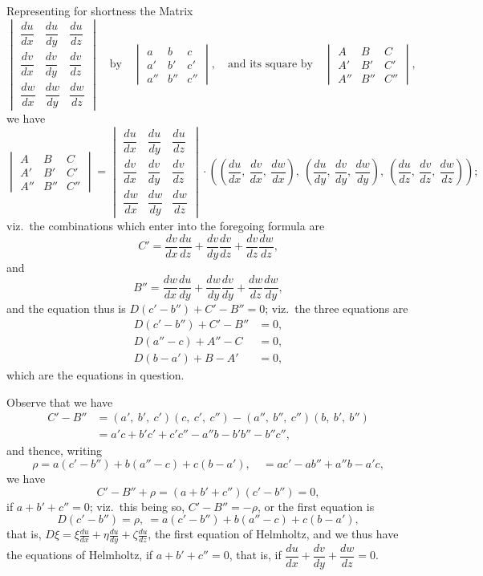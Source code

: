\documentclass[11pt,a4paper]{article}
\begin{document}
Representing for shortness the Matrix
\[
\begin{vmatrix}
\dfrac{du}{dx} & \dfrac{du}{dy} & \dfrac{du}{dz} \\[0.6em]
\dfrac{dv}{dx} & \dfrac{dv}{dy} & \dfrac{dv}{dz} \\[0.6em]
\dfrac{dw}{dx} & \dfrac{dw}{dy} & \dfrac{dw}{dz}
\end{vmatrix}
\quad\text{by}\quad
\begin{vmatrix}
a  & b  & c  \\
a' & b' & c' \\
a''& b''& c''
\end{vmatrix}, \quad\text{and its square by}\quad
\begin{vmatrix}
A  & B  & C  \\
A' & B' & C' \\
A''& B''& C''
\end{vmatrix},
\]
we have
\[
\begin{vmatrix}
A  & B  & C  \\
A' & B' & C' \\
A''& B''& C''
\end{vmatrix}
=
\begin{vmatrix}
\dfrac{du}{dx} & \dfrac{du}{dy} & \dfrac{du}{dz} \\[0.6em]
\dfrac{dv}{dx} & \dfrac{dv}{dy} & \dfrac{dv}{dz} \\[0.6em]
\dfrac{dw}{dx} & \dfrac{dw}{dy} & \dfrac{dw}{dz}
\end{vmatrix}
\cdot
\left(\left(\frac{du}{dx},\ \frac{dv}{dx},\ \frac{dw}{dx}\right),\ \left(\frac{du}{dy},\ \frac{dv}{dy},\ \frac{dw}{dy}\right),\ \left(\frac{du}{dz},\ \frac{dv}{dz},\ \frac{dw}{dz}\right)\right);
\]
viz.\ the combinations which enter into the foregoing formula are
\[
C' = \frac{dv}{dx}\frac{du}{dz} + \frac{dv}{dy}\frac{dv}{dz} + \frac{dv}{dz}\frac{dw}{dz},
\]
and
\[
B'' = \frac{dw}{dx}\frac{du}{dy} + \frac{dw}{dy}\frac{dv}{dy} + \frac{dw}{dz}\frac{dw}{dy},
\]
and the equation thus is $D(c' - b'') + C' - B'' = 0$; viz.\ the three equations are
\begin{align*}
D(c' - b'') + C' - B'' &= 0, \\
D(a'' - c) + A'' - C &= 0, \\
D(b - a') + B - A' &= 0,
\end{align*}
which are the equations in question.

Observe that we have
\begin{align*}
C' - B'' &= (a',\ b',\ c')(c,\ c',\ c'') - (a'',\ b'',\ c'')(b,\ b',\ b'') \\
&= a'c + b'c' + c'c'' - a''b - b'b'' - b''c'',
\end{align*}
and thence, writing
\[
\rho = a(c' - b'') + b(a'' - c) + c(b - a'),\quad = ac' - ab'' + a''b - a'c,
\]
we have
\[
C' - B'' + \rho = (a + b' + c'')(c' - b'') = 0,
\]
if $a + b' + c'' = 0$; viz.\ this being so, $C' - B'' = -\rho$, or the first equation is
\[
D(c' - b'') = \rho,\ = a(c' - b'') + b(a'' - c) + c(b - a'),
\]
that is, $\displaystyle D\xi = \xi\frac{du}{dx} + \eta\frac{du}{dy} + \zeta\frac{du}{dz}$, the first equation of Helmholtz, and we thus have the equations of Helmholtz, if $a + b' + c'' = 0$, that is, if $\dfrac{du}{dx} + \dfrac{dv}{dy} + \dfrac{dw}{dz} = 0$.
\end{document}
